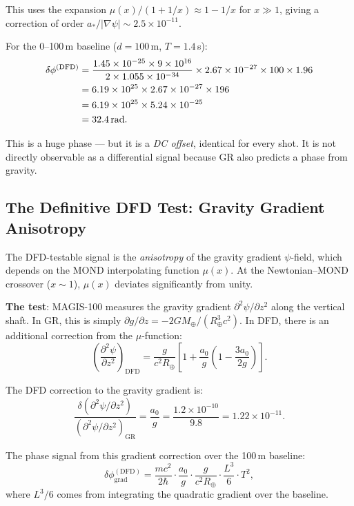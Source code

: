 \documentclass[11pt]{article}
\theoremstyle{definition}
\theoremstyle{remark}
\newcommand{\astar}{a_*}
\begin{document}
This uses the expansion $\mu(x)/(1+1/x) \approx 1 - 1/x$ for $x \gg 1$,
giving a correction of order $\astar/|\nabla\psi| \sim 2.5 \times 10^{-11}$.

For the 0--100\,m baseline ($d = 100$\,m, $T = 1.4$\,s):
\begin{align}
\delta\phi^{(\mathrm{DFD})} &= \frac{1.45 \times 10^{-25} \times 9 \times 10^{16}}
{2 \times 1.055 \times 10^{-34}} \times 2.67 \times 10^{-27}
\times 100 \times 1.96 \notag \\
&= 6.19 \times 10^{25} \times 2.67 \times 10^{-27} \times 196 \notag \\
&= 6.19 \times 10^{25} \times 5.24 \times 10^{-25} \notag \\
&= 32.4\,\mathrm{rad}.
\end{align}

This is a huge phase --- but it is a \emph{DC offset}, identical for every
shot. It is not directly observable as a differential signal because GR
also predicts a phase from gravity.

\subsection{The Definitive DFD Test: Gravity Gradient Anisotropy}

The DFD-testable signal is the \emph{anisotropy} of the gravity gradient
$\psi$-field, which depends on the MOND interpolating function $\mu(x)$.
At the Newtonian--MOND crossover ($x \sim 1$), $\mu(x)$ deviates
significantly from unity.

\textbf{The test}: MAGIS-100 measures the gravity gradient
$\partial^2 \psi / \partial z^2$ along the vertical shaft. In GR,
this is simply $\partial g / \partial z = -2GM_\oplus / (R_\oplus^3 c^2)$.
In DFD, there is an additional correction from the $\mu$-function:
\begin{equation}
\left(\frac{\partial^2\psi}{\partial z^2}\right)_{\mathrm{DFD}}
= \frac{g}{c^2 R_\oplus}\left[1 + \frac{a_0}{g}\left(1 - \frac{3a_0}{2g}\right)\right].
\end{equation}

The DFD correction to the gravity gradient is:
\begin{equation}
\frac{\delta(\partial^2\psi/\partial z^2)}{(\partial^2\psi/\partial z^2)_{\mathrm{GR}}}
= \frac{a_0}{g} = \frac{1.2 \times 10^{-10}}{9.8}
= 1.22 \times 10^{-11}.
\end{equation}

The phase signal from this gradient correction over the 100\,m baseline:
\begin{equation}
\delta\phi_{\mathrm{grad}}^{(\mathrm{DFD})} = \frac{mc^2}{2\hbar}
\cdot \frac{a_0}{g} \cdot \frac{g}{c^2 R_\oplus} \cdot \frac{L^3}{6} \cdot T^2,
\end{equation}
where $L^3/6$ comes from integrating the quadratic gradient over the baseline.
\end{document}
